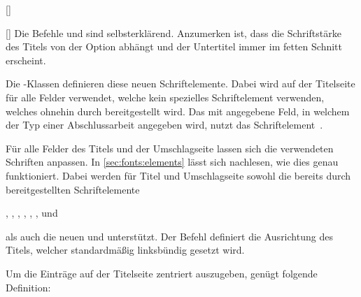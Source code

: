 \begin{Declaration*}{}
\begin{Declaration*}{}
\begin{Declaration*}{}
\begin{Declaration}{[]}
\begin{Declaration}{[]}
\printdeclarationlist%
%
%
Die Befehle  und  sind selbsterklärend. Anzumerken 
ist, dass die Schriftstärke des Titels von der Option  abhängt
und der Untertitel immer im fetten Schnitt erscheint. 
\end{Declaration}
\end{Declaration}

\begin{Declaration}[v2.02]{}
\begin{Declaration}[v2.02]{}
\begin{Declaration}[v2.06]{}
\printdeclarationlist%
%
%
Die \TUDScript-Klassen definieren diese neuen Schriftelemente. Dabei wird 
 auf der Titelseite für alle Felder verwendet, welche kein 
spezielles Schriftelement verwenden, welches ohnehin durch \KOMAScript{} 
bereitgestellt wird. Das mit  angegebene Feld, in welchem der Typ 
einer Abschlussarbeit angegeben wird, nutzt das Schriftelement~. 

Für alle Felder des Titels und der Umschlagseite lassen sich die verwendeten
Schriften anpassen. In \autoref{sec:fonts:elements} lässt sich nachlesen, wie 
dies genau funktioniert. Dabei werden für Titel und Umschlagseite sowohl die 
bereits durch \KOMAScript{} bereitgestellten Schriftelemente
\begin{Bundle}{}
, , , , 
, ,  und 
\end{Bundle}
als auch die neuen  und  unterstützt.
Der Befehl  definiert die Ausrichtung des Titels, welcher 
standardmäßig linksbündig gesetzt wird.
\begin{Example}
Um die Einträge auf der Titelseite zentriert auszugeben, genügt folgende 
Definition:
\begin{Code}
\let\raggedtitle\centering
\end{Code}
\end{Example}
\end{Declaration}
\end{Declaration}
\end{Declaration}


\end{Declaration*}
\end{Declaration*}
\end{Declaration*}
